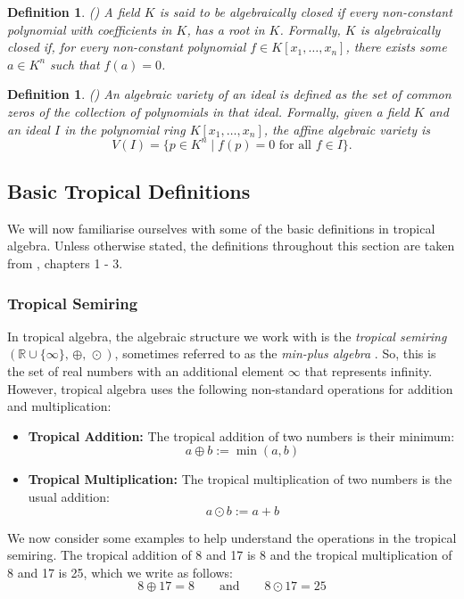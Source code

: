 \documentclass[11pt,reqno,a4paper]{article}
\theoremstyle{theoremstyle}
\theoremstyle{examplestyle}
\newtheorem{definition}[theorem]{Definition}
\theoremstyle{algorithmstyle}
\numberwithin{equation}{subsection}
\newcommand{\RR}{\mathbb{R}}
\begin{document}
\begin{definition} (\cite{G2016})
    A field $K$ is said to be algebraically closed if every non-constant polynomial with coefficients in $K$, has a root in $K$. Formally, $K$ is algebraically closed if, for every non-constant polynomial $f \in K[x_1,\ldots,x_n]$, there exists some $a \in K^n$ such that $f(a)= 0$.
\end{definition}

\begin{definition} (\cite{CLS2011})
    An algebraic variety of an ideal is defined as the set of common zeros of the collection of polynomials in that ideal. Formally, given a field $K$ and an ideal $I$ in the polynomial ring $K[x_1,\ldots,x_n]$, the affine algebraic variety is \[V(I) = \{p\in K^n \; | \; f(p) = 0 \text{ for all } f\in I\}.\]    
\end{definition}

\subsection{Basic Tropical Definitions}
We will now familiarise ourselves with some of the basic definitions in tropical algebra.
Unless otherwise stated, the definitions throughout this section are taken from \cite{MS2015}, chapters 1 - 3. 


\subsubsection*{Tropical Semiring} 
In tropical algebra, the algebraic structure we work with is the \textit{tropical semiring} $( \RR \cup \{ \infty \}, \, \oplus, \, \odot)$, sometimes referred to as the \textit{min-plus algebra} . So, this is the set of real numbers with an additional element $\infty$ that represents infinity. However, tropical algebra uses the following non-standard operations for addition and multiplication:
\begin{itemize}
    \item \textbf{Tropical Addition:} The tropical addition of two numbers is their minimum: \[a \oplus b := \min(a,b)\] 
    \item \textbf{Tropical Multiplication:} The tropical multiplication of two numbers is the usual addition: \[a \odot b := a + b\]
\end{itemize}
We now consider some examples to help understand the operations in the tropical semiring. The tropical addition of 8 and 17 is 8 and the tropical multiplication of 8 and 17 is 25, which we write as follows: \[8 \oplus 17 = 8 \hspace{2em} \text{and} \hspace{2em} 8 \odot 17 = 25\]
\end{document}
